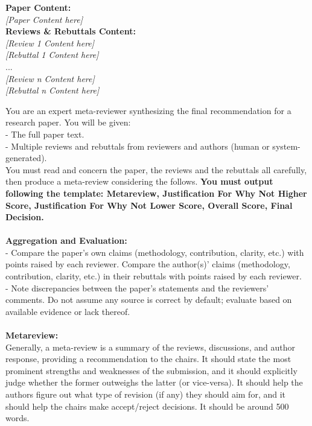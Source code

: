 \begin{figure*}[h]
\begin{prompt}[title={Prompt \thetcbcounter: LLM-as-Meta-Reviewer: Dimension COT}]
\textbf{Paper Content:} \\
\textit{[Paper Content here]} \\
\textbf{Reviews \& Rebuttals Content:} \\
\textit{[Review 1 Content here]} \\ 
\textit{[Rebuttal 1 Content here]} \\
... \\
\textit{[Review n Content here]} \\ 
\textit{[Rebuttal n Content here]} 
\end{prompt}
\end{figure*}


\begin{figure*}[h]
\label{Prompt: Meta-Template}
\begin{prompt}[title={Prompt \thetcbcounter: LLM-as-Meta-Reviewer: Template COT}]
You are an expert meta-reviewer synthesizing the final recommendation for a research paper. You will be given:\\
- The full paper text.\\
- Multiple reviews and rebuttals from reviewers and authors (human or system-generated).\\

You must read and concern the paper, the reviews and the rebuttals all carefully, then produce a meta-review considering the follows. 
\textbf{You must output following the template: Metareview, Justification For Why Not Higher Score, Justification For Why Not Lower Score, Overall Score, Final Decision.}\\ \\

\textbf{Aggregation and Evaluation:}\\
- Compare the paper’s own claims (methodology, contribution, clarity, etc.) with points raised by each reviewer. Compare the author(s)’ claims (methodology, contribution, clarity, etc.) in their rebuttals with points raised by each reviewer.\\
- Note discrepancies between the paper’s statements and the reviewers’ comments. Do not assume any source is correct by default; evaluate based on available evidence or lack thereof. \\ \\

\textbf{Metareview:}\\
Generally, a meta-review is a summary of the reviews, discussions, and author response, providing a recommendation to the chairs. It should state the most prominent strengths and weaknesses of the submission, and it should explicitly judge whether the former outweighs the latter (or vice-versa). It should help the authors figure out what type of revision (if any) they should aim for, and it should help the chairs make accept/reject decisions. It should be around 500 words.\\


\end{prompt}
\end{figure*}
